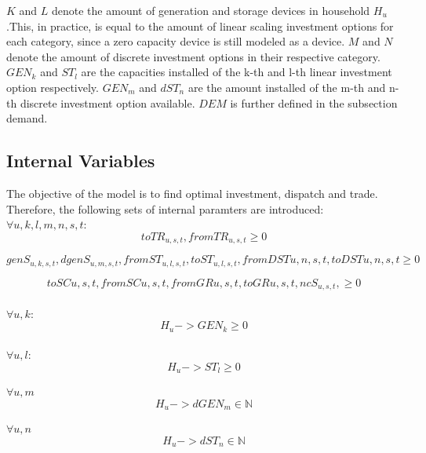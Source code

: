 \documentclass[
	11pt,								%
	DIV10,								%
	a4paper,         					%
	oneside,							%
	headheight=20pt,					%
	footheight=20pt,					%
    parskip=full,						%
    listof=totoc,						%
	bibliography=totoc,					%
	index=totoc,						%
]{scrartcl}
\begin{document}
$K$ and $L$ denote the amount of generation and storage devices in household $H_u$.This, in practice, is equal to the amount of linear scaling investment options for each category, since a zero capacity device is still modeled as a device. $M$ and $N$ denote the amount of discrete investment options in their respective category. $GEN_k$ and $ST_l$ are the capacities installed of the k-th and l-th linear investment option respectively. $GEN_m$ and $dST_n$ are the amount installed of the m-th and n-th discrete investment option available. $DEM$ is further defined in the subsection demand.





\subsection{Internal Variables}
The objective of the model is to find optimal investment, dispatch and trade. Therefore, the following sets of internal paramters are introduced:
	\\
	$\forall u,k,l,m,n,s,t$:
	\\
	\begin{equation}
		toTR_{u,s,t}, fromTR_{u,s,t} \geq 0
	\end{equation}
	
	\begin{equation}
		genS_{u,k,s,t}, dgenS_{u,m,s,t}, fromST_{u,l,s,t}, toST_{u,l,s,t}, fromDST{u,n,s,t}, toDST{u,n,s,t} \geq 0
	\end{equation}
	
	\begin{equation}
		toSC{u,s,t}, fromSC{u,s,t}, fromGR{u,s,t}, toGR{u,s,t}, ncS_{u,s,t},  \geq 0
	\end{equation}
	\\
	$\forall u,k$:
	\begin{equation}
		H_u->GEN_k \geq 0
	\end{equation}
	\\
	$\forall u,l$:
	\begin{equation}
		H_u->ST_l \geq 0
	\end{equation}
	
	$\forall u,m$
	\begin{equation}
		H_u->dGEN_m \in \mathbb{N}
	\end{equation}
	
	$\forall u,n$
	\begin{equation}
		H_u->dST_n \in \mathbb{N}
	\end{equation}
\end{document}
